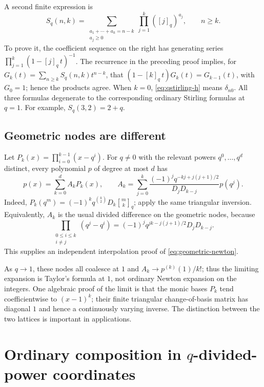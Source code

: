 \documentclass[11pt,a4paper]{article}
\numberwithin{equation}{section}
\theoremstyle{definition}
\theoremstyle{remark}
\newcommand{\qb}[2]{\genfrac{[}{]}{0pt}{}{#1}{#2}_{q}}
\newcommand{\qi}[1]{[#1]_{q}}
\begin{document}
A second finite expression is
\begin{equation}\label{eq:qstirling-h}
 S_q(n,k)=
 \sum_{\substack{a_1+\cdots+a_k=n-k\\a_j\ge0}}
       \prod_{j=1}^k(\qi j)^{a_j},\qquad n\ge k.
\end{equation}
To prove it, the coefficient sequence on the right has generating series
$\prod_{j=1}^k(1-\qi j\,t)^{-1}$. The recurrence in the preceding proof implies,
for $G_k(t)=\sum_{n\ge k}S_q(n,k)t^{n-k}$, that
$(1-\qi k\,t)G_k(t)=G_{k-1}(t)$, with $G_0=1$; hence the products agree.
When $k=0$, \eqref{eq:qstirling-h} means $\delta_{n0}$.
All three formulas degenerate to the corresponding ordinary Stirling formulas at
$q=1$. For example, $S_q(3,2)=2+q$.

\subsection{Geometric nodes are different}
Let $P_k(x)=\prod_{i=0}^{k-1}(x-q^i)$. For $q\ne0$ with the relevant powers
$q^0,\ldots,q^d$ distinct, every polynomial $p$ of degree at most $d$ has
\begin{equation}\label{eq:geometric-newton}
 p(x)=\sum_{k=0}^d A_kP_k(x),\qquad
 A_k=\sum_{j=0}^k
       \frac{(-1)^j q^{-kj+j(j+1)/2}}{D_jD_{k-j}}p(q^j).
\end{equation}
Indeed,
$P_k(q^m)=(-1)^kq^{\binom k2}D_k\qb mk$; apply the same triangular inversion.
Equivalently, $A_k$ is the usual divided difference on the geometric nodes,
because
\[
 \prod_{\substack{0\le i\le k\\i\ne j}}(q^j-q^i)
   =(-1)^j q^{jk-j(j+1)/2}D_jD_{k-j}.
\]
This supplies an independent interpolation proof of \eqref{eq:geometric-newton}.

As $q\to1$, these nodes all coalesce at $1$ and $A_k\to p^{(k)}(1)/k!$;
thus the limiting expansion is Taylor's formula at $1$, not ordinary Newton
expansion on the integers. One algebraic proof of the limit is that the monic
bases $P_k$ tend coefficientwise to $(x-1)^k$; their finite triangular
change-of-basis matrix has diagonal $1$ and hence a continuously varying inverse.
The distinction between the two lattices is important in applications.

\section{Ordinary composition in \texorpdfstring{$q$}{q}-divided-power coordinates}\label{sec:composition}
\end{document}
